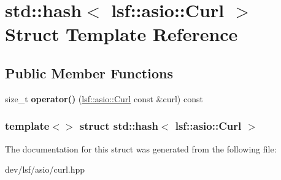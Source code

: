 \hypertarget{structstd_1_1hash_3_01lsf_1_1asio_1_1Curl_01_4}{
\section{std::hash$<$ lsf::asio::Curl $>$ Struct Template Reference}
\label{structstd_1_1hash_3_01lsf_1_1asio_1_1Curl_01_4}
}
\subsection*{Public Member Functions}
\begin{DoxyCompactItemize}
\item 
\hypertarget{structstd_1_1hash_3_01lsf_1_1asio_1_1Curl_01_4_a41d7790ec16532992fb51b9a2b62be21}{
size\_\-t {\bfseries operator()} (\hyperlink{classlsf_1_1asio_1_1Curl}{lsf::asio::Curl} const \&curl) const }
\label{structstd_1_1hash_3_01lsf_1_1asio_1_1Curl_01_4_a41d7790ec16532992fb51b9a2b62be21}

\end{DoxyCompactItemize}
\subsubsection*{template$<$$>$ struct std::hash$<$ lsf::asio::Curl $>$}



The documentation for this struct was generated from the following file:\begin{DoxyCompactItemize}
\item 
dev/lsf/asio/curl.hpp\end{DoxyCompactItemize}
